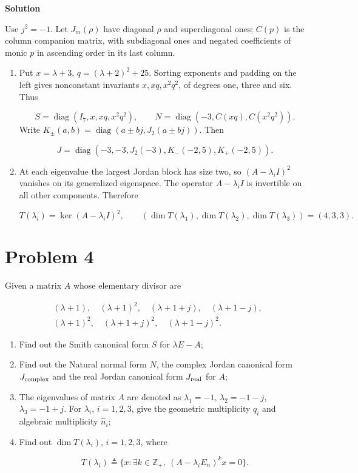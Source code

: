 \documentclass[UTF8,10pt,letterpaper,fontset=fandol]{ctexart}
\begin{document}
\par{}\textbf{Solution}\par
Use $j^2=-1$. Let $J_m(\rho)$ have diagonal $\rho$ and superdiagonal ones; $C(p)$ is the column companion matrix, with subdiagonal ones and negated coefficients of monic $p$ in ascending order in its last column.

\begin{enumerate}
\item Put $x=\lambda+3$, $q=(\lambda+2)^2+25$. Sorting exponents and padding on the left gives nonconstant invariants $x,xq,x^2q^2$, of degrees one, three and six. Thus

\[
\boxed{S=\operatorname{diag}(I_7,x,xq,x^2q^2),\qquad N=\operatorname{diag}(-3,C(xq),C(x^2q^2))}.
\]
Write $K_\pm(a,b)=\operatorname{diag}(a\pm bj,J_2(a\pm bj))$. Then

\[
\boxed{J=\operatorname{diag}(-3,-3,J_2(-3),K_-(-2,5),K_+(-2,5))}.
\]

\item At each eigenvalue the largest Jordan block has size two, so $(A-\lambda_iI)^2$ vanishes on its generalized eigenspace. The operator $A-\lambda_iI$ is invertible on all other components. Therefore

\[
\boxed{T(\lambda_i)=\ker(A-\lambda_iI)^2,\qquad (\dim T(\lambda_1),\dim T(\lambda_2),\dim T(\lambda_3))=(4,3,3)}.
\]

\end{enumerate}

\newpage

\section{Problem 4}
Given a matrix $A$ whose elementary divisor are

\[
\begin{gathered}
(\lambda+1),\quad(\lambda+1)^2,\quad(\lambda+1+j),\quad(\lambda+1-j),\\
(\lambda+1)^2,\quad(\lambda+1+j)^2,\quad(\lambda+1-j)^2.
\end{gathered}
\]

\begin{enumerate}
\item Find out the Smith canonical form $S$ for $\lambda E-A$;

\item Find out the Natural normal form $N$, the complex Jordan canonical form $J_{\rm complex}$ and the real Jordan canonical form $J_{\rm real}$ for $A$;

\item The eigenvalues of matrix $A$ are denoted as $\lambda_1=-1$, $\lambda_2=-1-j$, $\lambda_3=-1+j$. For $\lambda_i$, $i=1,2,3$, give the geometric multiplicity $q_i$ and algebraic multiplicity $\widehat n_i$;

\item Find out $\dim T(\lambda_i)$, $i=1,2,3$, where

\[
T(\lambda_i)\triangleq\{x:\exists k\in\mathbb Z_+,\ (A-\lambda_iE_n)^kx=0\}.
\]

\end{enumerate}
\end{document}
